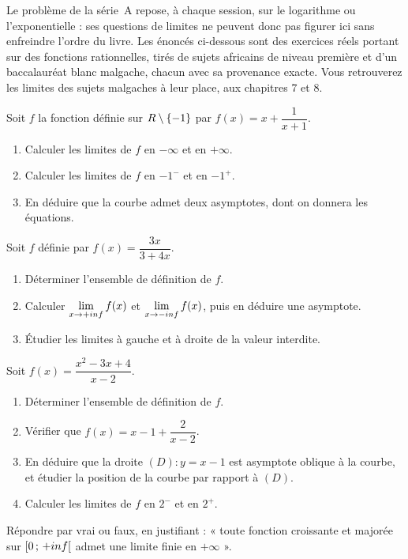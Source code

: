 \begin{annales}
Le problème de la série~A repose, à chaque session, sur le logarithme ou
l'exponentielle : ses questions de limites ne peuvent donc pas figurer ici
sans enfreindre l'ordre du livre. Les énoncés ci-dessous sont des exercices
réels portant sur des fonctions rationnelles, tirés de sujets africains de
niveau première et d'un baccalauréat blanc malgache, chacun avec sa
provenance exacte. Vous retrouverez les limites des sujets malgaches à leur
place, aux chapitres 7 et 8.

Soit $f$ la fonction définie sur $R\setminus\{-1\}$ par
$f(x) = x+\dfrac{1}{x+1}$.
\begin{enumerate}[label=\textbf{\alph*)}, leftmargin=*, itemsep=0.15em]
  \item Calculer les limites de $f$ en $-\infty$ et en $+\infty$.
  \item Calculer les limites de $f$ en $-1^{-}$ et en $-1^{+}$.
  \item En déduire que la courbe admet deux asymptotes, dont on donnera les
        équations.
\end{enumerate}

Soit $f$ définie par $f(x) = \dfrac{3x}{3+4x}$.
\begin{enumerate}[label=\textbf{\alph*)}, leftmargin=*, itemsep=0.15em]
  \item Déterminer l'ensemble de définition de $f$.
  \item Calculer $\limpinf f(x)$ et $\limminf f(x)$, puis en déduire une
        asymptote.
  \item Étudier les limites à gauche et à droite de la valeur interdite.
\end{enumerate}

Soit $f(x) = \dfrac{x^{2}-3x+4}{x-2}$.
\begin{enumerate}[label=\textbf{\alph*)}, leftmargin=*, itemsep=0.15em]
  \item Déterminer l'ensemble de définition de $f$.
  \item Vérifier que $f(x) = x-1+\dfrac{2}{x-2}$.
  \item En déduire que la droite $(D) : y = x-1$ est asymptote oblique à la
        courbe, et étudier la position de la courbe par rapport à $(D)$.
  \item Calculer les limites de $f$ en $2^{-}$ et en $2^{+}$.
\end{enumerate}

Répondre par vrai ou faux, en justifiant : « toute fonction croissante et
majorée sur $\left[0\,;\,+inf\right[$ admet une limite finie en
$+\infty$ ».
\end{annales}

